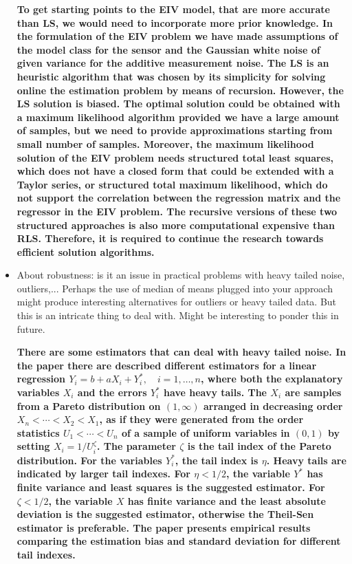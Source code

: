 \documentclass[11pt]{article}
\begin{document}
\begin{itemize}
	{\bfseries To get starting points to the EIV model, that are more accurate than LS, we would need to incorporate more prior knowledge. In the formulation of the EIV problem we have made assumptions of the model class for the sensor and the Gaussian white noise of given variance for the additive measurement noise. The LS is an heuristic algorithm that was chosen by its simplicity for solving online the estimation problem by means of recursion. However, the LS solution is biased. The optimal solution could be obtained with a maximum likelihood algorithm provided we have a large amount of samples, but we need to provide approximations starting from small number of samples. Moreover, the maximum likelihood solution of the EIV problem needs structured total least squares, which does not have a closed form that could be extended with a Taylor series, or structured total maximum likelihood, which do not support the correlation between the regression matrix and the regressor in the EIV problem. The recursive versions of these two structured approaches is also more computational expensive than RLS. Therefore, it is required to continue the research towards efficient solution algorithms.  }
	
	\item  About robustness: is it an issue in practical problems with heavy tailed noise, outliers,... Perhaps the use of median of means plugged into your approach might produce interesting alternatives for outliers or heavy tailed data. But this is an intricate thing to deal with. Might be interesting to ponder this in future.
	
	{\bfseries There are some estimators that can deal with heavy tailed noise. In the paper \cite{Balkema18} there  are described different estimators for a linear regression \linebreak $Y_i = b+a X_i + Y_i^{*}, \quad i = 1,\ldots,n$, where both the explanatory variables $X_i$ and the errors $Y_i^{*}$ have heavy tails. The $X_i$ are samples from a Pareto distribution on $(1, \infty)$ arranged in decreasing order $X_n<\cdots<X_2<X_1$, as if they were generated from the order statistics $U_1<\cdots<U_n$ of a sample of uniform variables in $(0,1)$ by setting $X_i = 1/U_i^\zeta$. The parameter $\zeta$ is the tail index of the Pareto distribution. For the variables $Y_i^*$, the tail index is $\eta$. 
	Heavy tails are indicated by larger tail indexes. For $\eta < 1/2$, the variable $Y^*$ has finite variance and least squares is the suggested estimator. For $\zeta < 1/2$, the variable $X$ has finite variance and the least absolute deviation is the suggested estimator, otherwise the Theil-Sen estimator is preferable. The paper presents empirical results comparing the estimation bias and standard deviation for different tail indexes.
		
}
\end{itemize}
\end{document}
